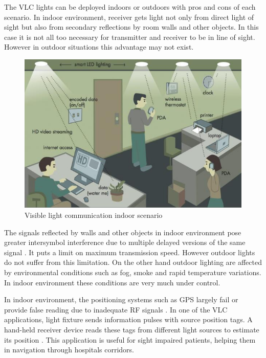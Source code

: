 The VLC lights can be deployed indoors or outdoors with pros and cons of each scenario. In indoor environment, receiver gets light not only from direct light of sight but also from secondary reflections by room walls and other objects. In this case it is not all too necessary for transmitter and receiver to be in line of sight. However in outdoor situations this advantage may not exist.

\begin{figure}[hbtp]
\centering
\includegraphics[angle=0,width=.9\textwidth]{./Figures/VLC_Room.jpg}

\caption[Visible light communication in office]{Visible light communication indoor scenario \cite{VLCroom}}
 \label{fig:VLC_room}
\end{figure}


The signals reflected by walls and other objects in indoor environment pose greater intersymbol interference due to multiple delayed versions of the same signal \cite{komine2004fundamental}. It puts a limit on maximum transmission speed. However outdoor lights do not suffer from this limitation. On the other hand outdoor lighting are affected by environmental conditions such as fog, smoke and rapid temperature variations. In indoor environment these conditions are very much under control.

In indoor environment, the positioning systems such as GPS largely fail or provide false reading due to inadequate RF signals \cite{dedes2005indoor}. In one of the VLC applications, light fixture sends information pulses with source position tags. A hand-held receiver device reads these tags from different light sources to estimate its position \cite{tanaka2009new}. This application is useful for sight impaired patients, helping them in navigation through hospitals corridors.

